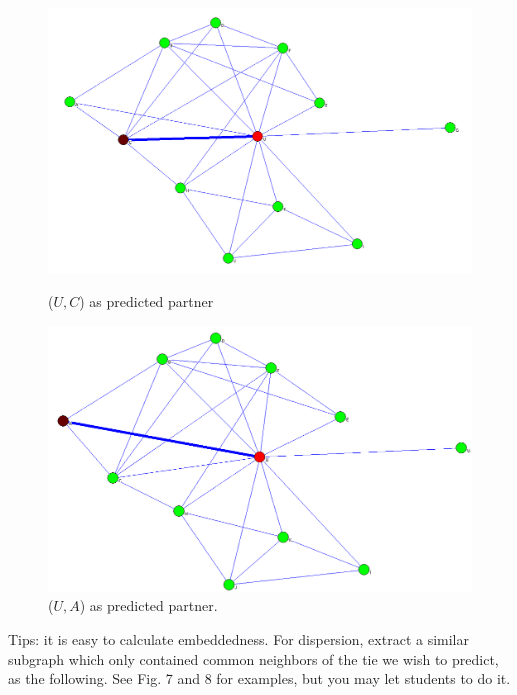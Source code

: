\documentclass[]{article}
\begin{document}
\begin{figure}[!htbp]
\begin{minipage}[b]{0.5\linewidth}
\centering
\includegraphics[width=\textwidth]{exp_embeddedness.jpg}
\caption{($U,C$) as predicted partner}
\label{fig:figure1}
\end{minipage}
\hspace{0.5cm}
\begin{minipage}[b]{0.5\linewidth}
\centering
\includegraphics[width=\textwidth]{p6embedd.png}
\caption{($U,A$) as predicted partner. }
\label{fig:figure2}
\end{minipage}
\end{figure}


\newpage

Tips: it is easy to calculate embeddedness.
For dispersion, extract a similar subgraph which only contained common neighbors of the tie we wish to predict, as the following.
See Fig. 7 and 8 for examples, but you may let students to do it.
\end{document}
